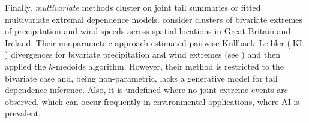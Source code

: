 \documentclass[12pt,compact]{article}
\DeclareMathOperator{\KL}{KL}
\begin{document}
Finally, \emph{multivariate} methods cluster on joint tail summaries or fitted multivariate extremal dependence models. 
\citet{Vignotto2021} consider clusters of bivariate extremes of precipitation and wind speeds across spatial locations in Great Britain and Ireland.
Their nonparametric approach estimated pairwise Kullback--Leibler ($\KL{}$) \citep{Kullback1951} divergences for bivariate precipitation and wind extremes (see \citet{Zscheischler2021}) and then applied the $k$-medoids algorithm. %
However, their method is restricted to the bivariate case and,
being non-parametric, lacks a generative model for tail dependence inference. %
Also, it is undefined where no joint extreme events are observed, which can occur frequently in environmental applications, where AI is prevalent.
\end{document}
